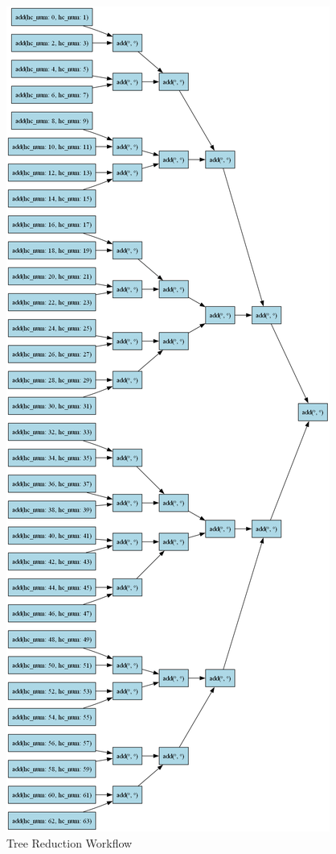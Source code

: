 \documentclass[conference]{IEEEtran}
\begin{document}
\begin{figure}[H]
    \centering
    \includegraphics[width=\columnwidth]{figures/dag_image_tree_reduction.png}
    \caption{Tree Reduction Workflow}
    \label{fig:tree_reduction}
\end{figure}
\end{document}

